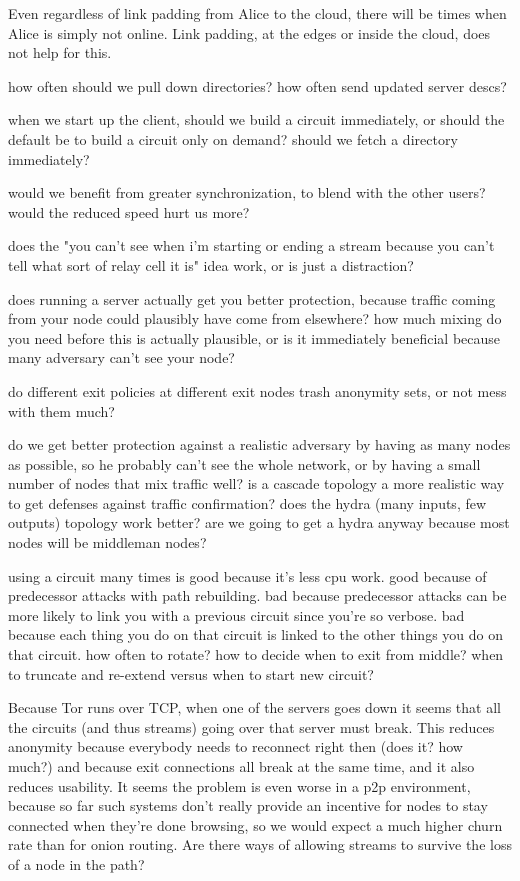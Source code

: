 \documentclass[times,10pt,twocolumn]{article}
\begin{document}
Even regardless of link padding from Alice to the cloud, there will be
times when Alice is simply not online. Link padding, at the edges or
inside the cloud, does not help for this.

how often should we pull down directories? how often send updated
server descs?

when we start up the client, should we build a circuit immediately,
or should the default be to build a circuit only on demand? should we
fetch a directory immediately?

would we benefit from greater synchronization, to blend with the other
users? would the reduced speed hurt us more?

does the "you can't see when i'm starting or ending a stream because
you can't tell what sort of relay cell it is" idea work, or is just
a distraction?

does running a server actually get you better protection, because traffic
coming from your node could plausibly have come from elsewhere? how
much mixing do you need before this is actually plausible, or is it
immediately beneficial because many adversary can't see your node?

do different exit policies at different exit nodes trash anonymity sets,
or not mess with them much?

do we get better protection against a realistic adversary by having as
many nodes as possible, so he probably can't see the whole network,
or by having a small number of nodes that mix traffic well? is a
cascade topology a more realistic way to get defenses against traffic
confirmation? does the hydra (many inputs, few outputs) topology work
better? are we going to get a hydra anyway because most nodes will be
middleman nodes?

using a circuit many times is good because it's less cpu work.
  good because of predecessor attacks with path rebuilding.
  bad because predecessor attacks can be more likely to link you with a
    previous circuit since you're so verbose.
  bad because each thing you do on that circuit is linked to the other
    things you do on that circuit.
  how often to rotate?
  how to decide when to exit from middle?
  when to truncate and re-extend versus when to start new circuit?

Because Tor runs over TCP, when one of the servers goes down it seems
that all the circuits (and thus streams) going over that server must
break. This reduces anonymity because everybody needs to reconnect
right then (does it? how much?) and because exit connections all break
at the same time, and it also reduces usability. It seems the problem
is even worse in a p2p environment, because so far such systems don't
really provide an incentive for nodes to stay connected when they're
done browsing, so we would expect a much higher churn rate than for
onion routing. Are there ways of allowing streams to survive the loss
of a node in the path?
\end{document}
